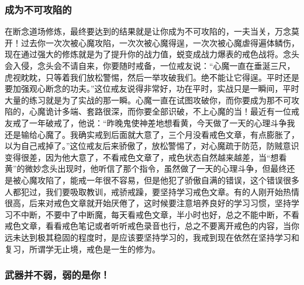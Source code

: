 \subsubsection{成为不可攻陷的}

在断念道场修炼，最终要达到的结果就是让你成为不可攻陷的，一夫当关，万念莫开！过去你一次次被心魔攻陷，一次次被心魔得逞，一次次被心魔虐得遍体鳞伤，现在通过强大的修炼就是为了提升你的战力值，蜕变成战力爆表的戒色战将。念头会入侵，念头会不请自来，你要随时戒备，一位戒友说：“心魔一直在垂涎三尺，虎视眈眈，只等着我们放松警惕，然后一举攻破我们。绝不能让它得逞。平时还是要加强观心断念的功夫。”这位戒友说得非常好，功在平时，实战只是一瞬间，平时大量的练习就是为了实战的那一瞬。心魔一直在试图攻破你，而你要成为那不可攻陷的，心魔诡计多端、套路很深，而你要全部识破，不上心魔的当！最近有一位戒友戒了一年破戒了，他说：“昨晚鬼使神差地想看黄，今天做了一天的心理斗争我还是输给心魔了。我确实戒到后面就大意了，三个月没看戒色文章，有点膨胀了，以为自己戒掉了。”这位戒友后来骄傲了，放松警惕了，对心魔疏于防范，防贼意识变得很差，因为他大意了，不看戒色文章了，戒色状态自然越来越差，当“想看黄”的微妙念头出现时，他听信了那个指令，虽然做了一天的心理斗争，但最终还是被心魔攻陷了，能戒一年很不容易，但是他犯了骄傲自满的错误，这个错误很多人都犯过，我们要吸取教训，戒骄戒躁，要坚持学习戒色文章。有的人刚开始热情很高，后来对戒色文章就开始厌倦了，这时候要注意培养良好的学习习惯，坚持学习不中断，不要中了中断魔，每天看戒色文章，半小时也好，总之不能中断，不看戒色文章，看看戒色笔记或者听听戒色录音也行，总之不要离开戒色的内容，当你远未达到极其稳固的程度时，是应该要坚持学习的，我戒到现在依然在坚持学习和复习，所谓学无止境，戒色是一生的修为。

\subsubsection{武器并不弱，弱的是你！}

